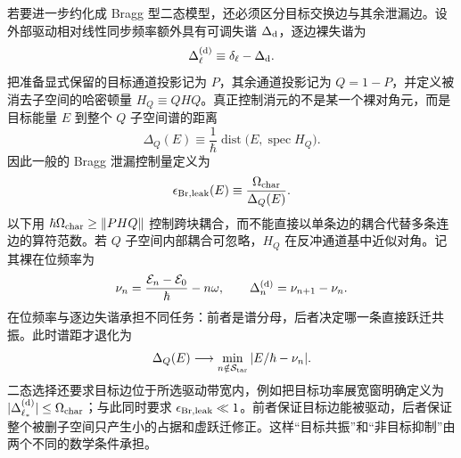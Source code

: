 若要进一步约化成 Bragg 型二态模型，还必须区分目标交换边与其余泄漏边。设外部驱动相对线性同步频率额外具有可调失谐 $\Delta_{\rm d}$，逐边裸失谐为
\begin{equation*}
\Delta_\ell^{(\rm d)}\equiv\delta_\ell-\Delta_{\rm d}.
\end{equation*}
把准备显式保留的目标通道投影记为 $P$，其余通道投影记为 $Q=1-P$，并定义被消去子空间的哈密顿量 $H_Q\equiv QHQ$。真正控制消元的不是某一个裸对角元，而是目标能量 $E$ 到整个 $Q$ 子空间谱的距离
\begin{equation*}
\Delta_Q(E)
\equiv\frac1\hbar\operatorname{dist}\!\bigl(E,\operatorname{spec}H_Q\bigr).
\end{equation*}
因此一般的 Bragg 泄漏控制量定义为
\begin{equation}
{
\epsilon_{\rm Br,leak}(E)
\equiv\frac{\Omega_{\rm char}}{\Delta_Q(E)}.}
\label{eq:bragg_target_leakage_criterion_dp72}
\end{equation}
以下用 $\hbar\Omega_{\rm char}\ge\|PHQ\|$ 控制跨块耦合，而不能直接以单条边的耦合代替多条连边的算符范数。若 $Q$ 子空间内部耦合可忽略，$H_Q$ 在反冲通道基中近似对角。记其裸在位频率为
\[
\nu_n=\frac{\mathcal E_n-\mathcal E_0}{\hbar}-n\omega,
\qquad \Delta_n^{(\rm d)}=\nu_{n+1}-\nu_n.
\]
在位频率与逐边失谐承担不同任务：前者是谱分母，后者决定哪一条直接跃迁共振。此时谱距才退化为
\begin{equation*}
\Delta_Q(E)\longrightarrow
\min_{n\notin\mathcal S_{\rm tar}}|E/\hbar-\nu_n|.
\end{equation*}
二态选择还要求目标边位于所选驱动带宽内，例如把目标功率展宽窗明确定义为 $|\Delta_{\ell_*}^{(\rm d)}|\le\Omega_{\rm char}$；与此同时要求 $\epsilon_{\rm Br,leak}\ll1$。前者保证目标边能被驱动，后者保证整个被删子空间只产生小的占据和虚跃迁修正。这样“目标共振”和“非目标抑制”由两个不同的数学条件承担。

